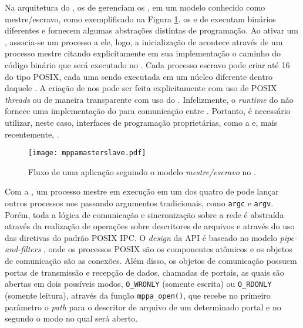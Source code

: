 Na arquitetura do \mppa, os \clusters de \IO gerenciam os \CCs, em um modelo conhecido como mestre/escravo, como exemplificado na Figura \ref{fig:masterslave}. os \CCs e \clusters de \IO executam binários diferentes e fornecem algumas abstrações distintas de programação. Ao ativar um \cluster, associa-se um processo a ele, logo, a inicialização de \CCs acontece através de um processo mestre citando explicitamente em sua implementação o caminho do código binário que será executado no \CC. Cada processo escravo pode criar até 16 \threads do tipo POSIX, cada uma sendo executada em um núcleo diferente dentro daquele \cluster. A criação de \threads nos \CCs pode ser feita explicitamente com uso de POSIX \textit{threads} ou de maneira transparente com uso do \OpenMP. Infelizmente, o \textit{runtime} do \mppa não fornece uma implementação do \MPI para comunicação entre \CCs. Portanto, é necessário utilizar, neste caso, interfaces de programação proprietárias, como a \IPC \cite{mppa2562013} e, mais recentemente, \ASYNC.

\begin{figure}[tb]
  \centering
  \caption{Fluxo de uma aplicação seguindo o modelo \textit{mestre/escravo} no \mppa.}
  \label{fig:masterslave}
  \texttt{[image: mppamasterslave.pdf]}
\end{figure}

Com a \IPC, um processo mestre em execução em um dos quatro \clusters de \IO pode lançar outros processos nos \CCs passando argumentos tradicionais, como \texttt{argc} e \texttt{argv}. Porém, toda a lógica de comunicação e sincronização sobre a rede \NoC é abstraída através da realização de operações sobre descritores de arquivos e através do uso das diretivas do padrão POSIX IPC. O \textit{design} da API é baseado no modelo \textit{pipe-and-filters} \cite{softwarecomponentmodels}, onde os processos POSIX são os componentes atômicos e os objetos de comunicação são as conexões. Além disso, os objetos de comunicação possuem portas de transmissão e recepção de dados, chamadas de portais, as quais são abertas em dois possíveis modos, \texttt{O\_WRONLY} (somente escrita) ou \texttt{O\_RDONLY} (somente leitura), através da função \texttt{mppa\_open()}, que recebe no primeiro parâmetro o \textit{path} para o descritor de arquivo de um determinado portal e no segundo o modo no qual será aberto.

